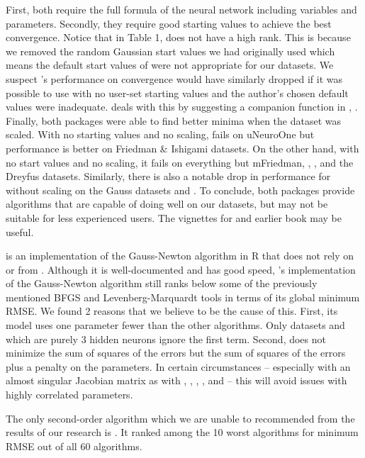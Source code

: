 First, both require the full formula of the neural network including
variables and parameters. Secondly, they require good starting values to
achieve the best convergence. Notice that in Table 1, 
does not have a high rank. This is because we removed the random
Gaussian start values we had originally used which means the default
start values of  were not appropriate for our datasets.
We suspect 's performance on convergence would have
similarly dropped if it was possible to use  with no
user-set starting values and the author's chosen default values were
inadequate.  deals with this by suggesting a companion
function in , . Finally, both packages
were able to find better minima when the dataset was scaled. With no
starting values and no scaling,  fails on
uNeuroOne but performance is better on Friedman \& Ishigami datasets. On
the other hand, with no start values and no scaling, it fails on
everything but mFriedman, , , and the
Dreyfus datasets. Similarly, there is also a notable drop in performance
for  without scaling on the Gauss datasets and
. To conclude, both packages provide algorithms that are
capable of doing well on our datasets, but may not be suitable for less
experienced users. The vignettes for  and earlier book
\citep{Nash-nlpor14} may be useful.

 \citep{R-brnn} is an implementation of the Gauss-Newton
algorithm in \textsf{R} that does not rely on  or 
from . Although it is well-documented and has good speed,
's implementation of the Gauss-Newton algorithm still
ranks below some of the previously mentioned BFGS and
Levenberg-Marquardt tools in terms of its global minimum RMSE. We found
2 reasons that we believe to be the cause of this. First, its model uses
one parameter fewer than the other algorithms. Only datasets
 and  which are purely 3 hidden neurons
ignore the first term. Second,  does not minimize the sum
of squares of the errors but the sum of squares of the errors plus a
penalty on the parameters. In certain circumstances -- especially with
an almost singular Jacobian matrix as with ,
, , , and 
-- this will avoid issues with highly correlated parameters.

The only second-order algorithm which we are unable to recommended from
the results of our research is  \citep{R-snnR}. It ranked
among the 10 worst algorithms for minimum RMSE out of all 60 algorithms.

